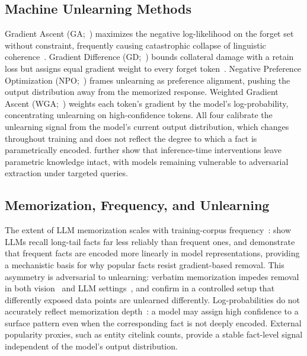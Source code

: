 
\subsection{Machine Unlearning Methods}
\label{subsec:gradient_unlearning}

Gradient Ascent (GA;~\citealt{jang2022knowledge}) maximizes the negative log-likelihood on the forget set without constraint, frequently causing catastrophic collapse of linguistic coherence~\cite{yao2024large, zhang2024negative}. Gradient Difference (GD;~\citealt{liu2022continual}) bounds collateral damage with a retain loss but assigns equal gradient weight to every forget token~\cite{bu2025unlearning}. Negative Preference Optimization (NPO;~\citealt{zhang2024negative}) frames unlearning as preference alignment, pushing the output distribution away from the memorized response. Weighted Gradient Ascent (WGA;~\citealt{wang2025rethinking}) weights each token's gradient by the model's log-probability, concentrating unlearning on high-confidence tokens. All four calibrate the unlearning signal from the model's current output distribution, which changes throughout training and does not reflect the degree to which a fact is parametrically encoded. \citet{lucki2025adversarial} further show that inference-time interventions leave parametric knowledge intact, with models remaining vulnerable to adversarial extraction under targeted queries.

\subsection{Memorization, Frequency, and Unlearning}
\label{subsec:memorization}

The extent of LLM memorization scales with training-corpus frequency~\cite{carlini2023quantifying, tirumala2022memorization}: \citet{kandpal2023large} show LLMs recall long-tail facts far less reliably than frequent ones, and \citet{merullo2025linear} demonstrate that frequent facts are encoded more linearly in model representations, providing a mechanistic basis for why popular facts resist gradient-based removal. This asymmetry is adversarial to unlearning: verbatim memorization impedes removal in both vision~\cite{NEURIPS2024_16e18fa3} and LLM settings~\cite{barbulescu2024each}, and \citet{baluta2024unlearning} confirm in a controlled setup that differently exposed data points are unlearned differently. Log-probabilities do not accurately reflect memorization depth~\cite{wang2025rethinking, hartmann2024undesirable}: a model may assign high confidence to a surface pattern even when the corresponding fact is not deeply encoded. External popularity proxies, such as entity citelink counts, provide a stable fact-level signal independent of the model's output distribution.

